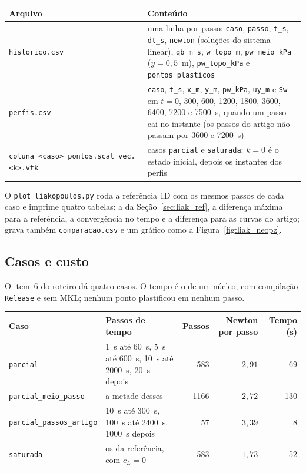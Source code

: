 \documentclass[11pt,a4paper]{article}
\begin{document}
\begin{center}\small
\begin{tabularx}{\textwidth}{@{}>{\raggedright\arraybackslash}p{4.3cm} >{\raggedright\arraybackslash}X@{}}
\toprule
Arquivo & Conteúdo\\
\midrule
\texttt{historico.csv} & uma linha por passo: \texttt{caso}, \texttt{passo}, \texttt{t\_s},
  \texttt{dt\_s}, \texttt{newton} (soluções do sistema linear), \texttt{qb\_m\_s},
  \texttt{w\_topo\_m}, \texttt{pw\_meio\_kPa} ($y=0{,}5$~m), \texttt{pw\_topo\_kPa} e
  \texttt{pontos\_plasticos}\\
\texttt{perfis.csv} & \texttt{caso}, \texttt{t\_s}, \texttt{x\_m}, \texttt{y\_m}, \texttt{pw\_kPa},
  \texttt{uy\_m} e \texttt{Sw} em $t=0$, 300, 600, 1200, 1800, 3600, 6400, 7200 e 7500~s, quando
  um passo cai no instante (os passos do artigo não passam por 3600 e 7200~s)\\
\texttt{coluna\_<caso>\_pontos}\allowbreak\texttt{.scal\_vec.<k>.vtk} & casos \texttt{parcial} e \texttt{saturada}:
  $k=0$ é o estado inicial, depois os instantes dos perfis\\
\bottomrule
\end{tabularx}
\end{center}

O \texttt{plot\_liakopoulos.py} roda a referência 1D com os mesmos passos de cada caso e imprime
quatro tabelas: a da Seção~\ref{sec:liak_ref}, a diferença máxima para a referência, a
convergência no tempo e a diferença para as curvas do artigo; grava também \texttt{comparacao.csv}
e um gráfico como a Figura~\ref{fig:liak_neopz}.

\subsection{Casos e custo}

O item~6 do roteiro dá quatro casos. O tempo é o de um núcleo, com compilação \texttt{Release} e
sem MKL; nenhum ponto plastificou em nenhum passo.

\begin{center}\small
\begin{tabularx}{\textwidth}{@{}l X r r r@{}}
\toprule
Caso & Passos de tempo & Passos & Newton por passo & Tempo (s)\\
\midrule
\texttt{parcial} & 1~s até 60~s, 5~s até 600~s, 10~s até 2000~s, 20~s depois & 583 & $2{,}91$ & 69\\
\texttt{parcial\_meio\_passo} & a metade desses & 1166 & $2{,}72$ & 130\\
\texttt{parcial\_passos\_artigo} & 10~s até 300~s, 100~s até 2400~s, 1000~s depois & 57 & $3{,}39$ & 8\\
\texttt{saturada} & os da referência, com $c_L=0$ & 583 & $1{,}73$ & 52\\
\bottomrule
\end{tabularx}
\end{center}
\end{document}
